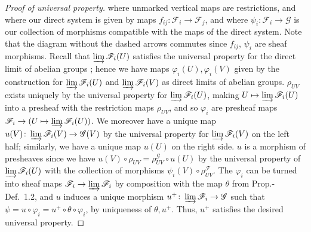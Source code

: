 \documentclass[12pt,letterpaper]{article}
\theoremstyle{definition}
\theoremstyle{remark}
\numberwithin{equation}{section}
\numberwithin{figure}{problem}
\begin{document}
\begin{proof}[Proof of universal property]
  where unmarked vertical maps are restrictions, and where our direct system is given by maps $f_{ij}\colon\mathscr{F}_i \to \mathscr{F}_j$, and where $\psi_i \colon \mathscr{F}_i \to \mathscr{G}$ is our collection of morphisms compatible with the maps of the direct system. Note that the diagram without the dashed arrows commutes since $f_{ij}$, $\psi_i$ are sheaf morphisms. Recall that $\varinjlim\mathscr{F}_i(U)$ satisfies the universal property for the direct limit of abelian groups \cite[III, Thm.~10.1]{Lan02}; hence we have maps $\varphi_i(U),\varphi_i(V)$ given by the construction for $\varinjlim\mathscr{F}_i(U)$ and $\varinjlim\mathscr{F}_i(V)$ as direct limits of abelian groups. $\rho_{UV}$ exists uniquely by the universal property for $\varinjlim\mathscr{F}_i(U)$, making $U \mapsto \varinjlim \mathscr{F}_i(U)$ into a presheaf with the restriction maps $\rho_{UV}$, and so $\varphi_i$ are presheaf maps $\mathscr{F}_i \to (U \mapsto \varinjlim\mathscr{F}_i(U))$. We moreover have a unique map $u(V)\colon\varinjlim\mathscr{F}_i(V) \to \mathscr{G}(V)$ by the universal property for $\varinjlim\mathscr{F}_i(V)$ on the left half; similarly, we have a unique map $u(U)$ on the right side. $u$ is a morphism of presheaves since we have $u(V) \circ \rho_{UV} = \rho_{UV}^\mathscr{G} \circ u(U)$ by the universal property of $\varinjlim \mathscr{F}_i(U)$ with the collection of morphisms $\psi_i(V) \circ \rho_{UV}^\mathscr{F}$. The $\varphi_i$ can be turned into sheaf maps $\mathscr{F}_i \to \varinjlim\mathscr{F}_i$ by composition with the map $\theta$ from Prop.-Def.~1.2, and $u$ induces a unique morphism $u^+\colon\varinjlim \mathscr{F}_i \to \mathscr{G}$ such that $\psi = u \circ \varphi_i = u^+ \circ \theta \circ \varphi_i$, by uniqueness of $\theta,u^+$. Thus, $u^+$ satisfies the desired universal property.
\end{proof}
\end{document}
